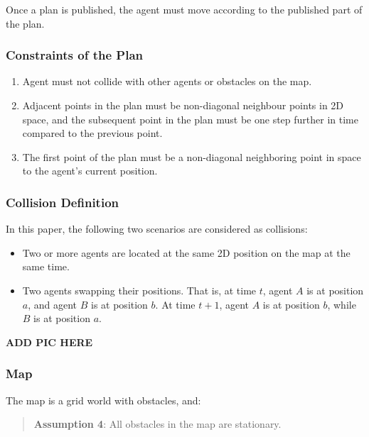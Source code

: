 Once a plan is published, the agent must move according to the published part of the plan.

\subsubsection{Constraints of the Plan}

\begin{enumerate}
    \item Agent must not collide with other agents or obstacles on the map.
    \item Adjacent points in the plan must be non-diagonal neighbour points in 2D space, and the subsequent point in the plan must be one step further in time compared to the previous point.
    \item The first point of the plan must be a non-diagonal neighboring point in space to the agent's current position.
\end{enumerate}

\subsubsection{Collision Definition}
In this paper, the following two scenarios are considered as collisions:
\begin{itemize}
    \item Two or more agents are located at the same 2D position on the map at the same time.
    \item Two agents swapping their positions. That is, at time $t$, agent $A$ is at position $a$, and agent $B$ is at position $b$. At time $t+1$, agent $A$ is at position $b$, while $B$ is at position $a$.
\end{itemize}

\textbf{ADD PIC HERE} %

\subsubsection{Map}
The map is a grid world with obstacles, and:
\begin{quotation}
    \textbf{Assumption 4}:
    All obstacles in the map are stationary.
\end{quotation}

